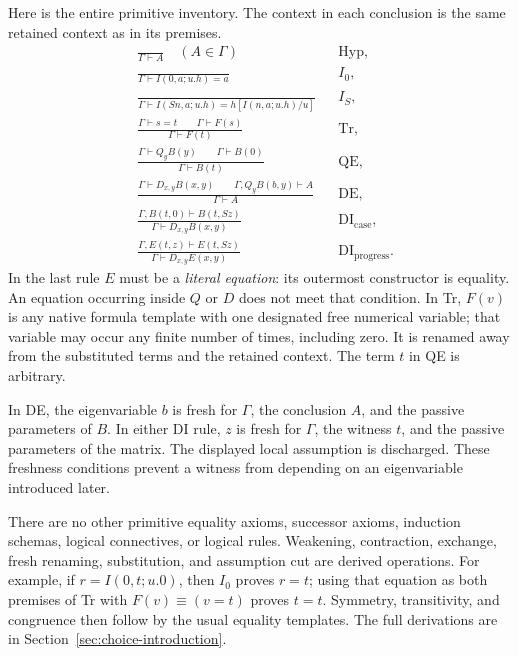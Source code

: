 Here is the entire primitive inventory. The context in each conclusion is
the same retained context as in its premises.
\begin{align*}
 &\frac{}{\Gamma\vdash A}\quad(A\in\Gamma)
 &&\mathrm{Hyp},\\[4pt]
 &\frac{}{\Gamma\vdash I(0,a;u.h)=a}
 &&I_0,\\[4pt]
 &\frac{}{\Gamma\vdash I(Sn,a;u.h)=h[I(n,a;u.h)/u]}
 &&I_S,\\[4pt]
 &\frac{\Gamma\vdash s=t\qquad\Gamma\vdash F(s)}
        {\Gamma\vdash F(t)}
 &&\mathrm{Tr},\\[4pt]
 &\frac{\Gamma\vdash Q_yB(y)\qquad\Gamma\vdash B(0)}
        {\Gamma\vdash B(t)}
 &&\mathrm{QE},\\[4pt]
 &\frac{\Gamma\vdash D_{x,y}B(x,y)\qquad
         \Gamma,Q_yB(b,y)\vdash A}
        {\Gamma\vdash A}
 &&\mathrm{DE},\\[4pt]
 &\frac{\Gamma,B(t,0)\vdash B(t,Sz)}
        {\Gamma\vdash D_{x,y}B(x,y)}
 &&\mathrm{DI}_{\mathrm{case}},\\[4pt]
 &\frac{\Gamma,E(t,z)\vdash E(t,Sz)}
        {\Gamma\vdash D_{x,y}E(x,y)}
 &&\mathrm{DI}_{\mathrm{progress}}.
\end{align*}
In the last rule $E$ must be a \emph{literal equation}: its outermost
constructor is equality. An equation occurring inside $Q$ or $D$ does not
meet that condition. In Tr, $F(v)$ is any native formula template with one
designated free numerical variable; that variable may occur any finite number
of times, including zero. It is renamed away from the substituted terms and
the retained context. The term $t$ in QE is arbitrary.

In DE, the eigenvariable $b$ is fresh for $\Gamma$, the conclusion $A$,
and the passive parameters of $B$. In either DI rule, $z$ is fresh for
$\Gamma$, the witness $t$, and the passive parameters of the matrix.
The displayed local assumption is discharged. These freshness conditions
prevent a witness from depending on an eigenvariable introduced later.

There are no other primitive equality axioms, successor axioms, induction
schemas, logical connectives, or logical rules. Weakening, contraction,
exchange, fresh renaming, substitution, and assumption cut are derived
operations. For example, if $r=I(0,t;u.0)$, then $I_0$ proves $r=t$;
using that equation as both premises of Tr with $F(v)\equiv(v=t)$ proves
$t=t$. Symmetry, transitivity, and congruence then follow by the usual
equality templates. The full derivations are in
Section~\ref{sec:choice-introduction}.

